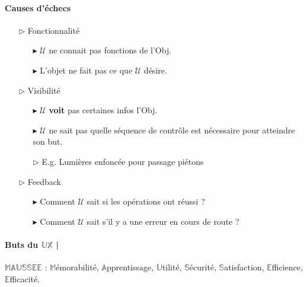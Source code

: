 \documentclass{report}
\begin{document}
\begin{multicols*}{3}
    \paragraph{Causes d'échecs}
    \begin{itemize}
        \item[$\rhd$] Fonctionnalité 
            \begin{itemize}
                \item[$\blacktriangleright$] $\mathcal{U}$ ne connait pas fonctions de l'Obj.
                \item[$\blacktriangleright$] L'objet ne fait pas ce que  
                    $\mathcal{U}$ désire. 
            \end{itemize}
        \item[$\rhd$] Visibilité 
            \begin{itemize}
                \item[$\blacktriangleright$] $\mathcal{U}$ \textbf{voit} 
                    pas certaines infos l'Obj.   
                \item[$\blacktriangleright$] 
                    $\mathcal{U}$ ne sait pas quelle séquence de contrôle est nécessaire pour 
                    atteindre son but.  
                \item[$\rhd$] E.g. Lumières enfoncée pour passage piétons
            \end{itemize}
        \item[$\rhd$] Feedback 
            \begin{itemize}
                \item[$\blacktriangleright$] Comment $\mathcal{U}$ 
                    sait si les opérations ont réussi ?
                \item[$\blacktriangleright$] 
                    Comment $\mathcal{U}$ 
                    sait s'il y a une erreur en cours de route ?
            \end{itemize}
    \end{itemize}

    \paragraph{Buts du $\mathbb{UX}$ | }
    $\mathbb{MAUSSEE}$ : $\mathbb{M}$émorabilité, 
    $\mathbb{A}$pprentissage, $\mathbb{U}$tilité,
    $\mathbb{S}$écurité, $\mathbb{S}$atisfaction, 
    $\mathbb{E}$fficience, $\mathbb{E}$fficacité. 


\end{multicols*}
\end{document}
